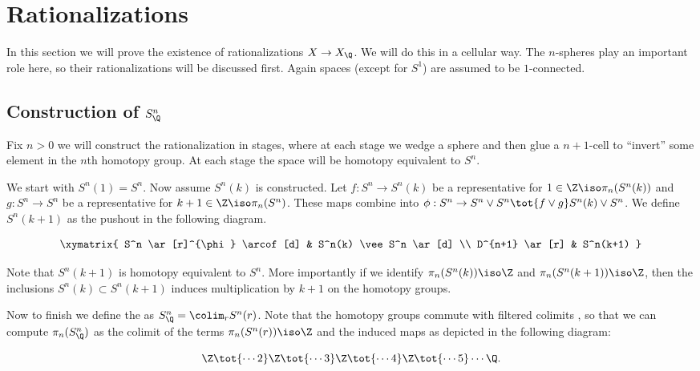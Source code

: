 
\section{Rationalizations}
\label{sec:rationalizations}

In this section we will prove the existence of rationalizations $X \to X_\Q$. We will do this in a cellular way. The $n$-spheres play an important role here, so their rationalizations will be discussed first. Again spaces (except for $S^1$) are assumed to be $1$-connected.

\subsection{Construction of \texorpdfstring{$S^n_\Q$}{SnQ}}
Fix $n>0$ we will construct the rationalization in stages, where at each stage we wedge a sphere and then glue a $n+1$-cell to ``invert'' some element in the $n$th homotopy group. At each stage the space will be homotopy equivalent to $S^n$.

We start with $S^n(1) = S^n$. Now assume $S^n(k)$ is constructed. Let $f: S^n \to S^n(k)$ be a representative for $1 \in \Z \iso \pi_n(S^n(k))$ and $g: S^n \to S^n$ be a representative for $k+1 \in \Z \iso \pi_n(S^n)$. These maps combine into $\phi: S^n \to S^n \vee S^n \tot{f \vee g} S^n(k) \vee S^n$. We define $S^n(k+1)$ as the pushout in the following diagram.

\begin{displaymath}
	\xymatrix{
	S^n \ar[r]^{\phi} \arcof[d] & S^n(k) \vee S^n \ar[d] \\
	D^{n+1} \ar[r] & S^n(k+1)
	}
\end{displaymath}

Note that $S^n(k+1)$ is homotopy equivalent to $S^n$. More importantly if we identify $\pi_n(S^n(k)) \iso \Z$ and $\pi_n(S^n(k+1)) \iso \Z$, then the inclusions $S^n(k) \subset S^n(k+1)$ induces multiplication by $k+1$ on the homotopy groups.

Now to finish we define the  as $S^n_\Q = \colim_r S^n(r)$. Note that the homotopy groups commute with filtered colimits \cite[9.4]{may}, so that we can compute $\pi_n(S^n_\Q)$ as the colimit of the terms $\pi_n(S^n(r)) \iso \Z$ and the induced maps as depicted in the following diagram:

$$ \Z \tot{\cdots 2} \Z \tot{\cdots 3} \Z \tot{\cdots 4} \Z \tot{\cdots 5} \cdots \Q. $$

